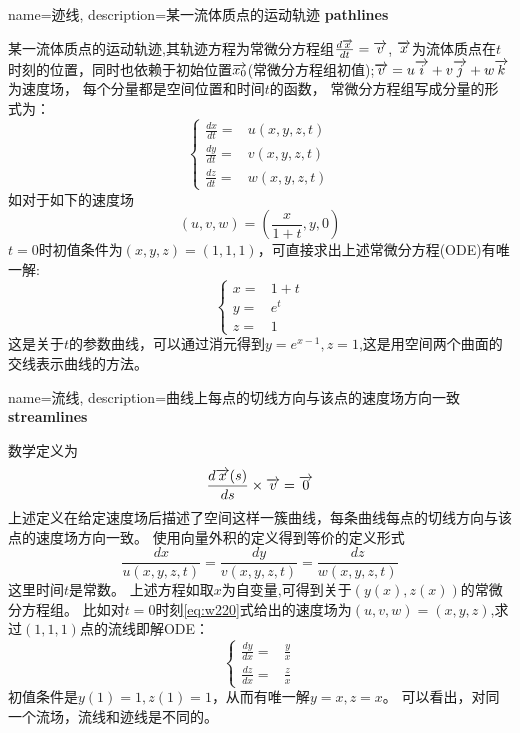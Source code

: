 {
  name=迹线,
  description={某一流体质点的运动轨迹}
}
\textbf{\gls{pathlines}}

某一流体质点的运动轨迹,其轨迹方程为常微分方程组$\frac{d \overrightarrow{x}}{d t}=\overrightarrow{v}$,
$\overrightarrow{x}$为流体质点在$t$时刻的位置，同时也依赖于初始位置$\overrightarrow{x_0}$(常微分方程组初值);$\overrightarrow{v}=u\overrightarrow{i}+v\overrightarrow{j}+w\overrightarrow{k}$为速度场，
每个分量都是空间位置和时间$t$的函数，
常微分方程组写成分量的形式为：
\begin{equation}\label{eq:22tr}
\begin{cases}
\frac{dx}{dt}=&u(x,y,z,t)\\
\frac{dy}{dt}=&v(x,y,z,t)\\
\frac{dz}{dt}=&w(x,y,z,t)
\end{cases}
\end{equation}
如对于如下的速度场
\begin{equation}\label{eq:w220}
(u,v,w)=(\frac{x}{1+t},y,0)
\end{equation}
$t=0$时初值条件为$(x,y,z)=(1,1,1)$，可直接求出上述常微分方程(ODE)有唯一解:
\begin{equation}
\begin{cases}
x=&1+t\\
y=&e^t\\
z=&1
\end{cases}
\end{equation}
这是关于$t$的参数曲线，可以通过消元得到$y=e^{x-1},z=1$,这是用空间两个曲面的交线表示曲线的方法。

{
  name=流线,
  description={曲线上每点的切线方向与该点的速度场方向一致}
}
\textbf{\gls{streamlines}}

数学定义为
\begin{equation}
\frac{d \overrightarrow{x}(s)}{d s}\times \overrightarrow{v} =\overrightarrow{0}
\end{equation}
上述定义在给定速度场后描述了空间这样一簇曲线，每条曲线每点的切线方向与该点的速度场方向一致。
使用向量外积的定义得到等价的定义形式
\begin{equation}\label{eq:2222st}
\frac{dx}{u(x,y,z,t)}=\frac{dy}{v(x,y,z,t)}=\frac{dz}{w(x,y,z,t)}
\end{equation}
这里时间$t$是常数。
上述方程如取$x$为自变量,可得到关于$(y(x),z(x))$的常微分方程组。
比如对$t=0$时刻\eqref{eq:w220}式给出的速度场为$(u,v,w)=(x,y,z)$,求过$(1,1,1)$点的流线即解ODE：
\begin{equation}
\begin{cases}
\frac{dy}{dx}=&\frac{y}{x}\\
\frac{dz}{dx}=&\frac{z}{x}
\end{cases}
\end{equation}
初值条件是$y(1)=1,z(1)=1$，从而有唯一解$y=x,z=x$。
可以看出，对同一个流场，流线和迹线是不同的。

